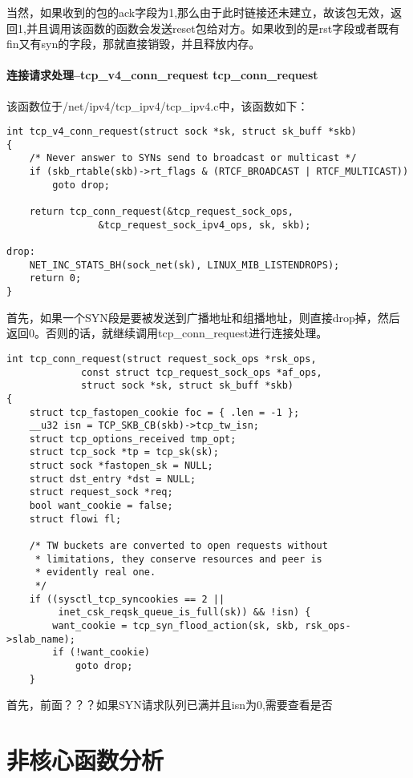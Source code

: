\documentclass[11pt, a4paper,oneside]{book}
\theoremstyle{ocrenumbox}
\theoremstyle{purplenumbox}
\theoremstyle{blackbox}
\begin{document}
                当然，如果收到的包的ack字段为1,那么由于此时链接还未建立，故该包无效，返回1,并且调用该函数的函数会发送reset包给对方。如果收到的是rst字段或者既有fin又有syn的字段，那就直接销毁，并且释放内存。
            \subsubsection{连接请求处理--tcp\_v4\_conn\_request  tcp\_conn\_request}
                该函数位于/net/ipv4/tcp\_ipv4/tcp\_ipv4.c中，该函数如下：
\begin{verbatim}
int tcp_v4_conn_request(struct sock *sk, struct sk_buff *skb)
{
    /* Never answer to SYNs send to broadcast or multicast */
    if (skb_rtable(skb)->rt_flags & (RTCF_BROADCAST | RTCF_MULTICAST))
        goto drop;

    return tcp_conn_request(&tcp_request_sock_ops,
                &tcp_request_sock_ipv4_ops, sk, skb);

drop:
    NET_INC_STATS_BH(sock_net(sk), LINUX_MIB_LISTENDROPS);
    return 0;
}
\end{verbatim}
                首先，如果一个SYN段是要被发送到广播地址和组播地址，则直接drop掉，然后返回0。否则的话，就继续调用tcp\_conn\_request进行连接处理。
\begin{verbatim}
int tcp_conn_request(struct request_sock_ops *rsk_ops,
             const struct tcp_request_sock_ops *af_ops,
             struct sock *sk, struct sk_buff *skb)
{
    struct tcp_fastopen_cookie foc = { .len = -1 };
    __u32 isn = TCP_SKB_CB(skb)->tcp_tw_isn;
    struct tcp_options_received tmp_opt;
    struct tcp_sock *tp = tcp_sk(sk);
    struct sock *fastopen_sk = NULL;
    struct dst_entry *dst = NULL;
    struct request_sock *req;
    bool want_cookie = false;
    struct flowi fl;

    /* TW buckets are converted to open requests without
     * limitations, they conserve resources and peer is
     * evidently real one.
     */
    if ((sysctl_tcp_syncookies == 2 ||
         inet_csk_reqsk_queue_is_full(sk)) && !isn) {
        want_cookie = tcp_syn_flood_action(sk, skb, rsk_ops->slab_name);
        if (!want_cookie)
            goto drop;
    }
\end{verbatim}
                首先，前面？？？如果SYN请求队列已满并且isn为0,需要查看是否
        
        
\chapter{非核心函数分析}
\end{document}
